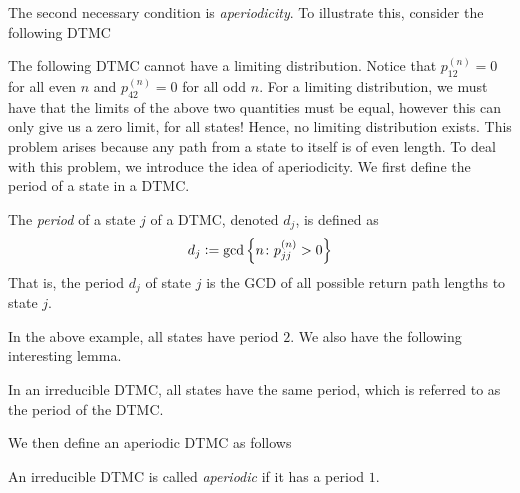 \documentclass[12pt]{article}
\theoremstyle{definition}
\begin{document}
\medskip

The second necessary condition is \emph{aperiodicity}. To illustrate this, consider the following DTMC

\begin{center}
\end{center}

The following DTMC cannot have a limiting distribution. Notice that $p_{12}^{(n)} = 0$ for all even $n$ and $p_{42}^{(n)} = 0$ for all odd $n$. For a limiting distribution, we must have that the limits of the above two quantities must be equal, however this can only give us a zero limit, for all states! Hence, no limiting distribution exists. This problem arises because any path from a state to itself is of even length. To deal with this problem, we introduce the idea of aperiodicity. We first define the period of a state in a DTMC. 

\begin{defn}
    The \emph{period} of a state $j$ of a DTMC, denoted $d_j$, is defined as
    \[
        d_j \vcentcolon= \gcd{\left\{ n \colon p_{jj}^{(n)} > 0 \right\}}
    \]
    That is, the period $d_j$ of state $j$ is the GCD of all possible return path lengths to state $j$.
\end{defn}

In the above example, all states have period $2$. We also have the following interesting lemma. 

\begin{lem} \label{lem:irrstate}
    In an irreducible DTMC, all states have the same period, which is referred to as the period of the DTMC. 
\end{lem}

We then define an aperiodic DTMC as follows

\begin{defn}[Aperiodicity]
    An irreducible DTMC is called \emph{aperiodic} if it has a period $1$.
\end{defn}
\end{document}
